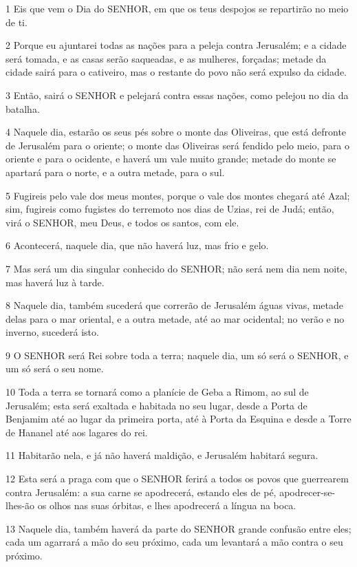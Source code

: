 \par 1 Eis que vem o Dia do SENHOR, em que os teus despojos se repartirão no meio de ti.
\par 2 Porque eu ajuntarei todas as nações para a peleja contra Jerusalém; e a cidade será tomada, e as casas serão saqueadas, e as mulheres, forçadas; metade da cidade sairá para o cativeiro, mas o restante do povo não será expulso da cidade.
\par 3 Então, sairá o SENHOR e pelejará contra essas nações, como pelejou no dia da batalha.
\par 4 Naquele dia, estarão os seus pés sobre o monte das Oliveiras, que está defronte de Jerusalém para o oriente; o monte das Oliveiras será fendido pelo meio, para o oriente e para o ocidente, e haverá um vale muito grande; metade do monte se apartará para o norte, e a outra metade, para o sul.
\par 5 Fugireis pelo vale dos meus montes, porque o vale dos montes chegará até Azal; sim, fugireis como fugistes do terremoto nos dias de Uzias, rei de Judá; então, virá o SENHOR, meu Deus, e todos os santos, com ele.
\par 6 Acontecerá, naquele dia, que não haverá luz, mas frio e gelo.
\par 7 Mas será um dia singular conhecido do SENHOR; não será nem dia nem noite, mas haverá luz à tarde.
\par 8 Naquele dia, também sucederá que correrão de Jerusalém águas vivas, metade delas para o mar oriental, e a outra metade, até ao mar ocidental; no verão e no inverno, sucederá isto.
\par 9 O SENHOR será Rei sobre toda a terra; naquele dia, um só será o SENHOR, e um só será o seu nome.
\par 10 Toda a terra se tornará como a planície de Geba a Rimom, ao sul de Jerusalém; esta será exaltada e habitada no seu lugar, desde a Porta de Benjamim até ao lugar da primeira porta, até à Porta da Esquina e desde a Torre de Hananel até aos lagares do rei.
\par 11 Habitarão nela, e já não haverá maldição, e Jerusalém habitará segura.
\par 12 Esta será a praga com que o SENHOR ferirá a todos os povos que guerrearem contra Jerusalém: a sua carne se apodrecerá, estando eles de pé, apodrecer-se-lhes-ão os olhos nas suas órbitas, e lhes apodrecerá a língua na boca.
\par 13 Naquele dia, também haverá da parte do SENHOR grande confusão entre eles; cada um agarrará a mão do seu próximo, cada um levantará a mão contra o seu próximo.
